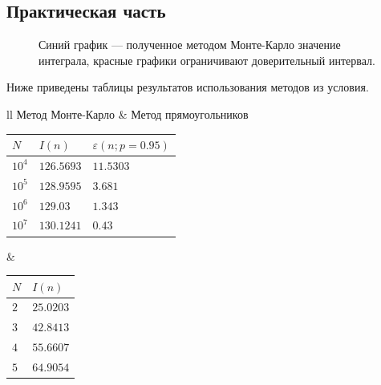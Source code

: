 \documentclass[12pt, a4paper]{article}
\begin{document}
\subsection{Практическая часть}
\begin{figure}[H]
\begin{center}
\end{center}
\caption{Синий график --- полученное методом Монте-Карло значение интеграла, красные графики ограничивают доверительный интервал.}
\end{figure}

Ниже приведены таблицы результатов использования методов из условия.

\begin{tabular}{ll}
Метод Монте-Карло & Метод прямоугольников \\
\begin{tabular}{|l|l|l|}
\hline
$N$  &  $I(n)$ & $\varepsilon(n;p=0.95)$ \\ 
\hline
$10^4$ & $126.5693$ & $11.5303$ \\
\hline
$10^5$ & $128.9595$ & $3.681$ \\
\hline
$10^6$ & $129.03$   & $1.343$ \\
\hline
$10^7$ & $130.1241$ & $0.43$ \\
\hline
\end{tabular} & \begin{tabular}{|l|l|}
\hline
$N$  &  $I(n)$ \\ 
\hline
$2$ & $25.0203$ \\ 
\hline
$3$ & $42.8413$ \\
\hline
$4$ & $55.6607$ \\
\hline
$5$ & $64.9054$ \\
\hline
\end{tabular} 
\end{tabular}
\newpage
\end{document}
